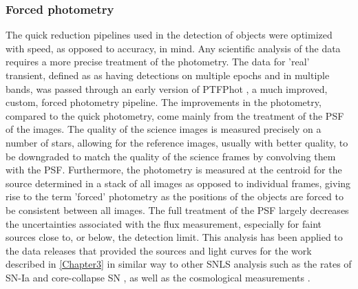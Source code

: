 \subsubsection{Forced photometry}
The quick reduction pipelines used in the detection of objects were optimized with speed, as opposed to accuracy, in mind. Any scientific analysis of the data requires a more precise treatment of the photometry. The data for 'real' transient, defined as as having detections on multiple epochs and in multiple bands, was passed through an early version of PTFPhot \citep{Firth2015}, a much improved, custom, forced photometry pipeline. The improvements in the photometry, compared to the quick photometry, come mainly from the treatment of the PSF of the images. The quality of the science images is measured precisely on a number of stars, allowing for the reference images, usually with better quality, to be downgraded to match the quality of the science frames by convolving them with the PSF. Furthermore, the photometry is measured at the centroid for the source determined in a stack of all images as opposed to individual frames, giving rise to the term 'forced' photometry as the positions of the objects are forced to be consistent between all images. The full treatment of the PSF largely decreases the uncertainties associated with the flux measurement, especially for faint sources close to, or below, the detection limit. This analysis has been applied to the data releases that provided the sources and light curves for the work described in \cref{Chapter3} in similar way to other SNLS analysis such as the rates of SN-Ia \citep{Perrett2012} and core-collapse SN \citep{Bazin2009}, as well as the cosmological measurements \citep{Astier2006,Sullivan2011}.

